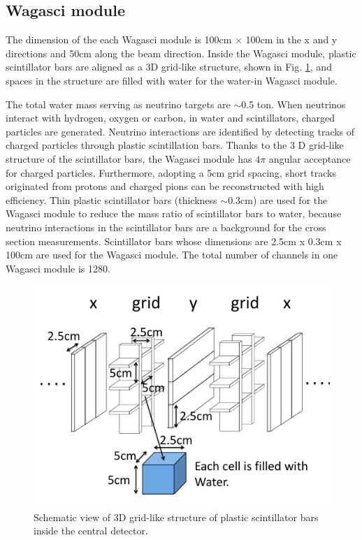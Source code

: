 \subsection{Wagasci module}
The dimension of the each Wagasci module is 100cm $\times$ 100cm in the x and y directions
and 50cm along the beam direction.
Inside the Wagasci module, plastic scintillator bars are aligned as a 3D grid-like structure, shown in Fig. \ref{fig:3dgrid},
and spaces in the structure are filled with water for the water-in Wagasci module.

The total water mass serving as neutrino targets are $\sim$0.5 ton.
When neutrinos interact with hydrogen, oxygen or carbon, in water and scintillators,
charged particles are generated.
Neutrino interactions are identified by detecting tracks of charged particles through plastic scintillation bars.
Thanks to the 3 D grid-like structure of the scintillator bars, 
the Wagasci module has $4\pi$ angular acceptance for charged particles.
Furthermore, adopting a 5cm grid spacing, short tracks originated from protons and charged pions can be reconstructed
with high efficiency.
Thin plastic scintillator bars (thickness $\sim 0.3$cm) are used for the Wagasci module
to reduce  the mass ratio of scintillator bars to water,
because neutrino interactions in the scintillator bars are a background for the cross section measurements.
Scintillator bars whose dimensions are 2.5cm x 0.3cm x 100cm are used for the Wagasci module.
The total number of channels in one Wagasci module is 1280.

\begin{figure}[tbh]
\begin{center}
\includegraphics[width=0.6\linewidth]{fig/3d_grid_structure.pdf}
\end{center}
\caption{
Schematic view of 3D grid-like structure of plastic scintillator bars inside the central detector.
}
\label{fig:3dgrid}
\end{figure}
